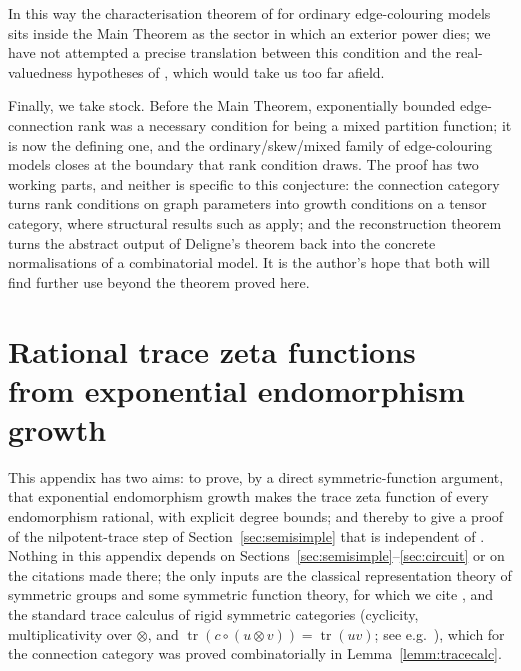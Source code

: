 \documentclass[11pt]{article}
\newcommand{\tr}{\operatorname{tr}}
\begin{document}
In this way the characterisation theorem of \cite{Sch15} for
ordinary edge-colouring models sits inside
the Main Theorem as the sector in which an exterior power
dies; we have not attempted a precise translation between this
condition and the real-valuedness hypotheses of \cite{Sch15},
which would take us too far afield.

Finally, we take stock. Before the Main Theorem, exponentially
bounded edge-connection rank was a necessary condition for being
a mixed partition function; it is now the defining one, and the
ordinary/skew/mixed family of edge-colouring models closes at the
boundary that rank condition draws. The proof has two working parts, and neither is
specific to this conjecture: the connection category turns rank
conditions on graph parameters into growth conditions on a tensor
category, where structural results such as \cite{EP26} apply; and
the reconstruction theorem turns the abstract output of Deligne's
theorem back into the concrete normalisations of a combinatorial
model. It is the author's hope that both will find further use
beyond the theorem proved here.

\appendix
\section[Rational trace zeta functions from exponential
endomorphism growth]{Rational trace zeta functions\texorpdfstring{\\}{ }from
exponential endomorphism growth}\label{app:zeta}

This appendix has two aims: to prove, by a direct
symmetric-function argument, that
exponential endomorphism growth makes the trace zeta function of
every endomorphism rational, with explicit degree bounds; and
thereby to give a proof of the nilpotent-trace step of
Section~\ref{sec:semisimple} that is independent of
\cite{EP26}. Nothing in this appendix depends on
Sections~\ref{sec:semisimple}--\ref{sec:circuit} or on the
citations made there; the only inputs are the classical
representation theory of symmetric groups and some symmetric
function theory, for which we cite
\cite{Sag01,Mac95,FH91}, and the standard trace calculus of rigid
symmetric categories (cyclicity, multiplicativity over $\otimes$,
and $\tr(c\circ(u\otimes v))=\tr(uv)$; see
e.g.\ \cite[\S4.7]{EGNO15}), which for the connection category
was proved combinatorially in Lemma~\ref{lemm:tracecalc}.
\end{document}
